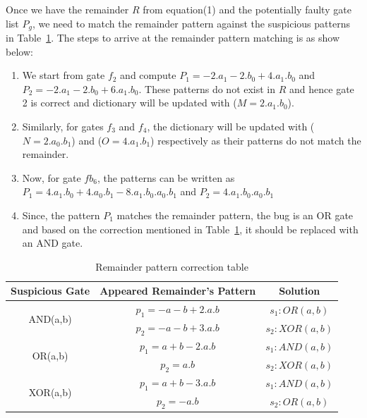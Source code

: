 \documentclass{article}
\begin{document}
Once we have the remainder $R$ from equation(1) and the potentially faulty gate list $P_g$, we need to match the remainder pattern against the suspicious patterns in Table~\ref{correction}. The steps to arrive at the remainder pattern matching is as show below: 

\begin{enumerate}
    \item We start from gate $f_2$ and compute $P_1 = -2.a_1-2.b_0+4.a_1.b_0$ and $P_2 = -2.a_1-2.b_0+6.a_1.b_0$. These patterns do not exist in $R$ and hence gate 2 is correct and dictionary will be updated with ($M=2.a_1.b_0$).
    \item Similarly, for gates $f_3$ and $f_4$, the dictionary will be updated with ($N=2.a_0.b_1$) and ($O=4.a_1.b_1$) respectively as their patterns do not match the remainder.
    \item Now, for gate $fb_6$, the patterns can be written as $P_1=4.a_1.b_0+4.a_0.b_1-8.a_1.b_0.a_0.b_1$ and $P_2=4.a_1.b_0.a_0.b_1$
    \item Since, the pattern $P_1$ matches the remainder pattern, the bug is an OR gate and based on the correction mentioned in Table~\ref{correction}, it should be replaced with an AND gate.
\end{enumerate}

\begin{table}[]
\centering
\caption{Remainder pattern correction table}
\label{correction}
\begin{tabular}{|c|c|c|}
\hline
\textbf{Suspicious Gate}&\textbf{Appeared Remainder's Pattern}&\textbf{Solution}\\
\hline
\multirow{2}{*}{AND(a,b)} & $p_1=-a-b+2.a.b$ & $s_1: OR(a,b)$ \\\cline{2-3}
&$p_2=-a-b+3.a.b$ & $s_2: XOR(a,b)$\\
\hline
\multirow{2}{*}{OR(a,b)} & $p_1=a+b-2.a.b$ & $s_1: AND(a,b)$  \\\cline{2-3}
&$p_2=a.b$ & $s_2: XOR(a,b)$\\
\hline
\multirow{2}{*}{XOR(a,b)} & $p_1=a+b-3.a.b$ & $s_1: AND(a,b)$ \\\cline{2-3}
&$p_2=-a.b$ & $s_2: OR(a,b)$\\
\hline
\end{tabular}
\end{table}
\end{document}

